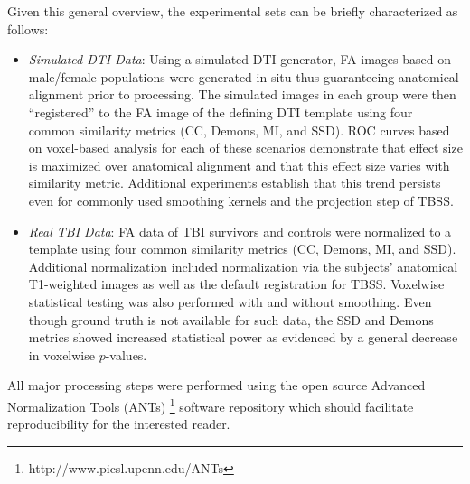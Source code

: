 \documentclass[final,5p,times,twocolumn]{elsarticle}
\begin{document}
Given this general overview, the experimental sets can be briefly
characterized as follows:
\begin{itemize}
  \item {\it Simulated DTI Data}:  Using a simulated DTI generator,
  FA images based on male/female populations were generated in situ
  thus guaranteeing anatomical alignment prior to processing.
  The simulated images in each group were then ``registered'' to the FA image
  of the defining DTI 
  template using four common similarity metrics (CC, Demons, MI, and SSD).  
  ROC curves based on voxel-based analysis for each of these scenarios demonstrate that 
  effect size is maximized over anatomical alignment and that
  this effect size varies with similarity metric.  Additional
  experiments establish that this trend persists even for commonly used smoothing
  kernels and the projection step of TBSS.
  \item {\it Real TBI Data}:  FA data of TBI survivors and controls were 
  normalized to a template using four common similarity metrics
  (CC, Demons, MI, and SSD).  Additional normalization included normalization via
  the subjects' anatomical T1-weighted images as well as the default registration for TBSS.
  Voxelwise statistical testing was also performed with
  and without smoothing.  Even though ground truth is not available for such
  data, the SSD and Demons metrics showed increased statistical power as evidenced
  by a general decrease in voxelwise $p$-values.
\end{itemize}
All major processing steps were performed using the open source Advanced Normalization Tools 
(ANTs)%
\footnote{
http://www.picsl.upenn.edu/ANTs
}
software repository which should facilitate reproducibility for the interested 
reader.


\end{document}
